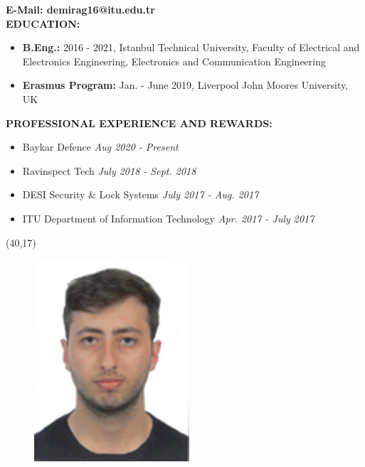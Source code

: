 \vspace{-3mm}
\textbf{E-Mail: {\normalfont demirag16@itu.edu.tr}} \\


\textbf{EDUCATION:}
\vspace{-3mm}
\begin{itemize}
  \item \textbf{B.Eng.:} 2016 - 2021, Istanbul Technical University, Faculty of Electrical and Electronics Engineering, Electronics and Communication Engineering
  \item \textbf{Erasmus Program:} Jan. - June 2019, Liverpool John Moores University, UK
\end{itemize}

\textbf{PROFESSIONAL EXPERIENCE AND REWARDS:}
\vspace{-3mm}
\begin{itemize}
  \item Baykar Defence \hfill \textit{Aug 2020 - Present}
  \item Ravinspect Tech \hfill \textit{July 2018 - Sept. 2018}
  \item DESI Security \& Lock Systems \hfill \textit{July 2017 - Aug. 2017}
  \item ITU Department of Information Technology \hfill \textit{Apr. 2017 - July 2017}
\end{itemize}


\vspace{-3mm}

\newpage

\vspace*{5cm}
\newsavebox{\mysquare}
\savebox{\mysquare}{\textcolor{black}{\rule[2.3pt]{3.4pt}{3.4pt}}}

\setlength{\TPHorizModule}{10pt}
\setlength{\TPVertModule}{10pt}

\begin{textblock}{1}(40,17)
  \begin{figure}[p]
    \includegraphics[scale=1,keepaspectratio=true]{figures/vesikalıkbengü.png}
  \end{figure}

\end{textblock}


